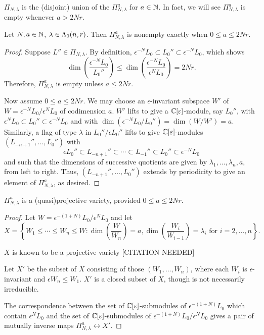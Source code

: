 \documentclass[a4paper, 11pt]{report}
\begin{document}
$\Pi_{N,\lambda}$ is the (disjoint) union of the $\Pi_{N,\lambda}^a$ for $a\in\mathbb{N}$. In fact, we will see $\Pi_{N,\lambda}^a$ is empty whenever $a > 2Nr$.

\begin{lemma}
Let $N,a\in\mathbb{N}$, $\lambda\in\Lambda_0(n,r)$. Then $\Pi_{N,\lambda}
^a$ is nonempty exactly when $0\le a \le 2Nr$.
\end{lemma}

\begin{proof}
Suppose $L''\in\Pi_{N,\lambda}$. By definition, $\epsilon^{-N}L_0\subset L_0''\subset \epsilon^{-N}L_0$, which shows
\begin{equation*}
\dim\left(\frac{\epsilon^{-N}L_0}{L_0''}\right) \le \dim\left(\frac{\epsilon^{-N}L_0}{\epsilon^N L_0}\right) = 2Nr.
\end{equation*}
Therefore, $\Pi_{N,\lambda}^a$ is empty unless $a\le 2Nr$.

Now assume $0\le a\le 2Nr$. We may choose an $\epsilon$-invariant subspace $W'$ of $W = \epsilon^{-N}L_0/{\epsilon^N L_0}$ of codimension $a$. $W'$ lifts to give a $\mathbb{C}[\varepsilon]$-module, say $L_0''$, with $\epsilon^N L_0\subset L_0''\subset \epsilon^{-N}L_0$ and with $\dim(\epsilon^{-N}L_0/{L_0''}) = \dim(W/W') = a$. Similarly, a flag of type $\lambda$ in $L_0''/{\epsilon L_0''}$ lifts to give $\mathbb{C}[\varepsilon]$-modules $(L_{-n+1}'',\ldots,L_0'')$ with
\begin{equation*}
\epsilon L_0''\subset L_{-n+1}''\subset\cdots\subset L_{-1}''\subset L_0''\subset \epsilon^{-N}L_0
\end{equation*}
and such that the dimensions of successive quotients are given by $\lambda_1,\ldots,\lambda_n,a$, from left to right. Thus, $(L_{-n+1}'',\ldots,L_0'')$ extends by periodicity to give an element of $\Pi_{N,\lambda}^a$, as desired.
\end{proof}

\begin{lemma}
$\Pi_{N,\lambda}^a$ is a (quasi)projective variety, provided $0\le a\le 2Nr$.
\end{lemma}
\begin{proof}
Let $W= \epsilon^{-(1+N)}L_0/{\epsilon^N L_0}$ and let
\begin{equation*}
X = \left\{W_1\le\cdots\le W_n\le W:\dim\left(\frac{W}{W_n}\right)=a, \dim\left(\frac{W_i}{W_{i-1}}\right) = \lambda_i \text{ for } i=2,\ldots,n\right\}.
\end{equation*}

$X$ is known to be a projective variety {\color{red}[CITATION NEEDED]}

Let $X'$ be the subset of $X$ consisting of those $(W_1,\ldots, W_n)$, where each $W_i$ is $\epsilon$-invariant and $\epsilon W_n \le W_1$. $X'$ is a closed subset of $X$, though is not necessarily irreducible.

The correspondence between the set of $\mathbb{C}[\varepsilon]$-submodules of $\epsilon^{-(1+N)}L_0$ which contain $\epsilon^N L_0$ and the set of $\mathbb{C}[\varepsilon]$-submodules of $\epsilon^{-(1+N)}L_0/{\epsilon^N L_0}$ gives a pair of mutually inverse maps $\Pi_{N,\lambda}^a\leftrightarrow X'$.


\end{proof}
\end{document}
